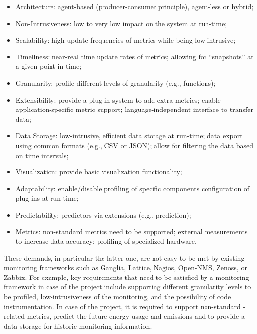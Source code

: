 \documentclass[10pt,letterpaper]{IEEEtran}
\begin{document}
\begin{itemize}
\item Architecture:
agent-based (producer-consumer principle), agent-less or hybrid;


\item Non-Intrusiveness:
low to very low impact on the system at run-time;

\item Scalability:
high update frequencies of metrics while being low-intrusive; 

\item Timeliness: near-real time update rates of metrics; allowing for “snapshots” at a given point in time;

\item Granularity: profile different levels of granularity (e.g., functions);

\item Extensibility: provide a plug-in system to add extra metrics;
enable application-specific metric support; language-independent interface to transfer data;

\item Data Storage:
low-intrusive, efficient data storage at run-time; data export using common formats (e.g., CSV or JSON);
allow for filtering the data based on time intervals;

\item Visualization: provide basic visualization functionality;

\item Adaptability: enable/disable profiling of specific components configuration of plug-ins at run-time;

\item Predictability: predictors via extensions (e.g.,  prediction);

\item Metrics: non-standard metrics need to be supported;
external measurements to increase data accuracy; profiling of specialized hardware.
\end{itemize}

These demands, in particular the latter one, are not easy to be met by existing monitoring frameworks
such as Ganglia, Lattice, Nagios, Open-NMS, Zenoss, or Zabbix.
For example, key requirements that need to be satisfied by a monitoring framework in case of the \EXCESS project include
supporting different granularity levels to be profiled, low-intrusiveness of the monitoring, and the possibility of
code instrumentation. In case of the \ECO project, it is required to support non-standard -related metrics,
predict the future energy usage and emissions and to provide a data storage for historic monitoring information.
\end{document}
